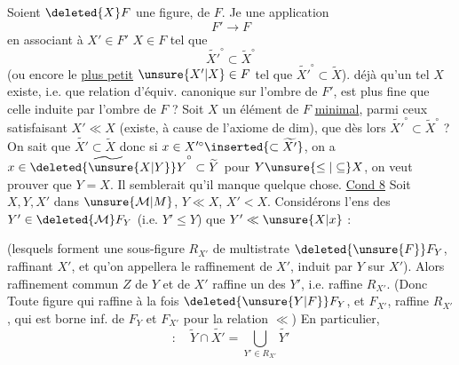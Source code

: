 Soient $\deleted{X}F$ une figure,   de $F$. Je   une application
\[
 F'\longrightarrow F
\]
en associant à  $X'\in F'$  $X\in F$ tel que
\[
 \widetilde{X'}^\circ\subset\widetilde X^\circ
\]
(ou encore le \uline{plus petit}  $\unsure{X'|X}\in F$ tel que $\widetilde{X'}^\circ\subset\widetilde X$).  déjà qu'un tel $X$ existe, i.e. que  relation d'équiv. canonique sur l'ombre de $F'$, est plus fine que celle induite par l'ombre de $F$ ? Soit $X$ un élément de $F$ \uline{minimal}, parmi ceux satisfaisant $X'\ll X$ (existe, à cause de l'axiome de dim),  que dès lors $\widetilde{X'}^\circ\subset\widetilde X^\circ$ ?  On sait que $\widetilde{X'}\subset\widetilde X$ donc si $x\in X'^\circ\inserted{\subset\widetilde{X'}}$, on a $x\in\widetilde{\deleted{\unsure{X|Y}}Y}^\circ\subset\widetilde Y$ pour $Y\unsure{\leq|\subseteq}X$, on veut prouver que $Y=X$. Il semblerait qu'il manque quelque chose.
\uline{Cond 8} Soit $X,Y,X'$ dans $\unsure{\mathcal M|M}$, $Y\ll X$, $X'<X$. Considérons l'ens des $Y'\in\deleted{\mathcal M}F_Y$ (i.e. $Y'\leq Y$)  que $Y'\ll\unsure{X|x}$ :

(lesquels forment une sous-figure $R_{X'}$ de  multistrate $\deleted{\unsure{F}}F_Y$,  raffinant $X'$, et qu'on appellera le raffinement de $X'$, induit par $Y$ sur $X'$). Alors  raffinement commun $Z$ de $Y$ et de $X'$ raffine un des $Y'$, i.e. raffine $R_{X'}$. (Donc Toute figure qui raffine à la fois $\deleted{\unsure{Y|F}}F_Y$, et $F_{X'}$, raffine $R_{X'}$, qui est  borne inf. de $F_Y$ et $F_{X'}$ pour la relation $\ll$) En particulier,
\[
 :\quad \widetilde Y\cap\widetilde{X'}=\bigcup_{Y'\in R_{X'}}\widetilde{Y'}
\]

